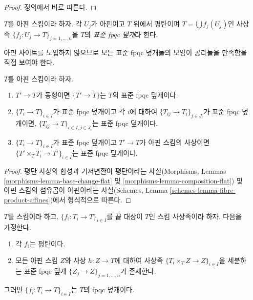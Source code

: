 \begin{proof}
정의에서 바로 따른다.
\end{proof}

\begin{definition}
\label{definition-standard-fpqc}
$T$를 아핀 스킴이라 하자. 각 $U_j$가 아핀이고 $T$ 위에서 평탄이며
$T = \bigcup f_j(U_j)$인 사상족
$\{f_j : U_j \to T\}_{j = 1, \ldots, n}$을 $T$의
{\it 표준 fpqc 덮개}라 한다.
\end{definition}

\noindent
아핀 사이트를 도입하지 않으므로 모든 표준 fpqc 덮개들의 모임이 공리들을
만족함을 직접 보여야 한다.

\begin{lemma}
\label{lemma-fpqc-affine-axioms}
$T$를 아핀 스킴이라 하자.
\begin{enumerate}
\item $T' \to T$가 동형이면 $\{T' \to T\}$는 $T$의 표준 fpqc 덮개이다.
\item $\{T_i \to T\}_{i\in I}$가 표준 fpqc 덮개이고 각 $i$에 대하여
$\{T_{ij} \to T_i\}_{j\in J_i}$가 표준 fpqc 덮개이면,
$\{T_{ij} \to T\}_{i \in I, j\in J_i}$는 표준 fpqc 덮개이다.
\item $\{T_i \to T\}_{i\in I}$가 표준 fpqc 덮개이고 $T' \to T$가 아핀
스킴의 사상이면 $\{T' \times_T T_i \to T'\}_{i\in I}$는 표준 fpqc
덮개이다.
\end{enumerate}
\end{lemma}

\begin{proof}
평탄 사상의 합성과 기저변환이 평탄이라는 사실(Morphisms, Lemmas
\ref{morphisms-lemma-base-change-flat} 및
\ref{morphisms-lemma-composition-flat}) 및 아핀 스킴의 섬유곱이 아핀이라는
사실(Schemes, Lemma \ref{schemes-lemma-fibre-product-affines})에서 형식적으로
따른다.
\end{proof}

\begin{lemma}
\label{lemma-fpqc-covering-affines-mapping-in}
$T$를 스킴이라 하고, $\{f_i : T_i \to T\}_{i \in I}$를 끝 대상이
$T$인 스킴 사상족이라 하자. 다음을 가정한다.
\begin{enumerate}
\item 각 $f_i$는 평탄이다.
\item 모든 아핀 스킴 $Z$와 사상 $h : Z \to T$에 대하여 사상족
$\{T_i \times_T Z \to Z\}_{i \in I}$을 세분하는 표준 fpqc 덮개
$\{Z_j \to Z\}_{j = 1, \ldots, n}$가 존재한다.
\end{enumerate}
그러면 $\{f_i : T_i \to T\}_{i \in I}$는 $T$의 fpqc 덮개이다.
\end{lemma}


